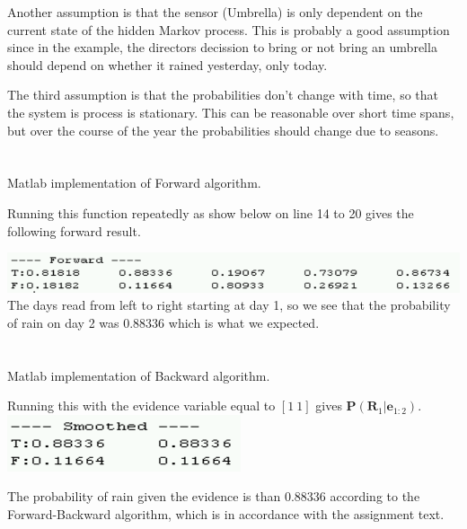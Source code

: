 \documentclass{article}
\begin{document}
\begin{itemize}
        Another assumption is that the sensor (Umbrella) is only dependent on the current state of the hidden Markov process. This is probably a good assumption since in the example, the directors decission to bring or not bring an umbrella should depend on whether it rained yesterday, only today. 

        The third assumption is that the probabilities don't change with time, so that the system is process is stationary. This can be reasonable over short time spans, but over the course of the year the probabilities should change due to seasons.

\end{itemize}

\section{}
Matlab implementation of Forward algorithm.


Running this function repeatedly as show below on line 14 to 20 gives the following forward result. 



\includegraphics[width=\linewidth]{forward_result.png}
The days read from left to right starting at day 1, so we see that the probability of rain on day 2 was 0.88336 which is what we expected. 


\section{}
Matlab implementation of Backward algorithm.


Running this with the evidence variable equal to $[1\  1]$ gives $\mathbf{P}(\mathbf{R}_1 | \mathbf{e}_{1:2})$.
\includegraphics[width=0.4\linewidth]{smoothing_short_result.png}

The probability of rain given the evidence is than 0.88336 according to the Forward-Backward algorithm, which is in accordance with the assignment text. 
\end{document}
